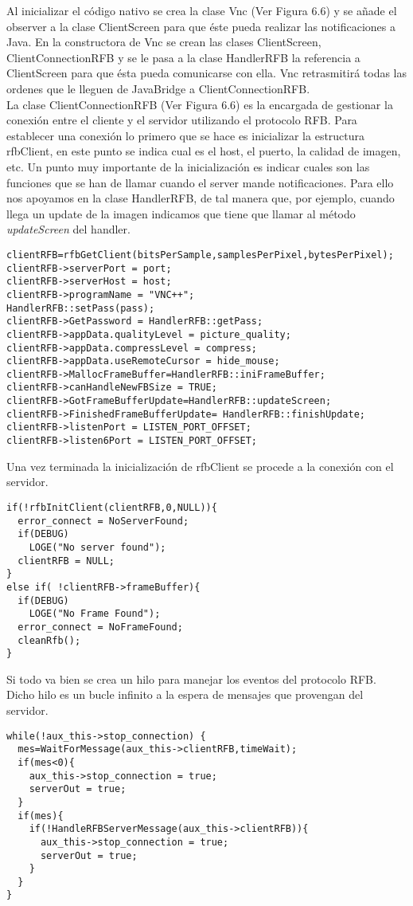 Al inicializar el código nativo se crea la clase Vnc (Ver Figura 6.6) y se añade el observer a la clase ClientScreen para que éste pueda realizar las notificaciones a Java. En la constructora de Vnc se crean las clases ClientScreen, ClientConnectionRFB y se le pasa a la clase HandlerRFB la referencia a ClientScreen para que ésta pueda comunicarse con ella. Vnc retrasmitirá todas las ordenes que le lleguen de JavaBridge a ClientConnectionRFB.\\

La clase ClientConnectionRFB (Ver Figura 6.6) es la encargada de gestionar la conexión entre el cliente y el servidor utilizando el protocolo RFB. Para establecer una conexión lo primero que se hace es inicializar la estructura rfbClient, en este punto se indica cual es el host, el puerto, la calidad de imagen, etc. Un punto muy importante de la inicialización es indicar cuales son las funciones que se han de llamar cuando el server mande notificaciones. Para ello nos apoyamos en la clase HandlerRFB, de tal manera que, por ejemplo, cuando llega un update de la imagen indicamos que tiene que llamar al método \emph{updateScreen} del handler.
\begin{lstlisting}
clientRFB=rfbGetClient(bitsPerSample,samplesPerPixel,bytesPerPixel);
clientRFB->serverPort = port;
clientRFB->serverHost = host;
clientRFB->programName = "VNC++";
HandlerRFB::setPass(pass);
clientRFB->GetPassword = HandlerRFB::getPass;
clientRFB->appData.qualityLevel = picture_quality;
clientRFB->appData.compressLevel = compress;
clientRFB->appData.useRemoteCursor = hide_mouse;
clientRFB->MallocFrameBuffer=HandlerRFB::iniFrameBuffer;
clientRFB->canHandleNewFBSize = TRUE;
clientRFB->GotFrameBufferUpdate=HandlerRFB::updateScreen;
clientRFB->FinishedFrameBufferUpdate= HandlerRFB::finishUpdate;
clientRFB->listenPort = LISTEN_PORT_OFFSET;
clientRFB->listen6Port = LISTEN_PORT_OFFSET;
\end{lstlisting}

Una vez terminada la inicialización de rfbClient se procede a la conexión con el servidor.
\begin{lstlisting}
if(!rfbInitClient(clientRFB,0,NULL)){
  error_connect = NoServerFound;
  if(DEBUG)
    LOGE("No server found");
  clientRFB = NULL;
}
else if( !clientRFB->frameBuffer){
  if(DEBUG)
    LOGE("No Frame Found");
  error_connect = NoFrameFound;
  cleanRfb();
}
\end{lstlisting}

Si todo va bien se crea un hilo para manejar los eventos del protocolo RFB. Dicho hilo es un bucle infinito a la espera de mensajes que provengan del servidor.
\begin{lstlisting}
while(!aux_this->stop_connection) {
  mes=WaitForMessage(aux_this->clientRFB,timeWait);
  if(mes<0){
    aux_this->stop_connection = true;
    serverOut = true;
  }
  if(mes){
    if(!HandleRFBServerMessage(aux_this->clientRFB)){
      aux_this->stop_connection = true;
      serverOut = true;
    }
  }
}
\end{lstlisting}

